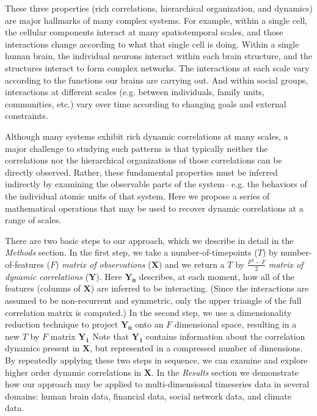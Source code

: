 \documentclass[english]{article}
\begin{document}
These three properties (rich correlations, hierarchical organization, and dynamics) are major hallmarks of many complex systems.  For example, within a single cell, the cellular components interact at many spatiotemporal scales, and those interactions change according to what that single cell is doing.  Within a single human brain, the individual neurons interact within each brain structure, and the structures interact to form complex networks.  The interactions at each scale vary according to the functions our brains are carrying out.  And within social groups, interactions at different scales (e.g. between individuals, family units, communities, etc.) vary over time according to changing goals and external constraints.

Although many systems exhibit rich dynamic correlations at many scales, a major challenge to studying such patterns is that typically neither the correlations nor the hierarchical organizations of those correlations can be directly observed.  Rather, these fundamental properties must be inferred indirectly by examining the observable parts of the system-- e.g. the behaviors of the individual atomic units of that system.  Here we propose a series of mathematical operations that may be used to recover dynamic correlations at a range of scales.

There are two basic steps to our approach, which we describe in detail in the \textit{Methods} section.  In the first step, we take a number-of-timepoints ($T$) by number-of-features ($F$) \textit{matrix of observations} ($\mathbf{X}$) and we return a $T$ by $\frac{F^2 - F}{2}$ \textit{matrix of dynamic correlations} ($\mathbf{Y}$).  Here $\mathbf{Y_0}$ describes, at each moment, how all of the features (columns of $\mathbf{X}$) are inferred to be interacting.  (Since the interactions are assumed to be non-recurrent and symmetric, only the upper triangle of the full correlation matrix is computed.)  In the second step, we use a dimensionality reduction technique to project $\mathbf{Y_0}$ onto an $F$ dimensional space, resulting in a new $T$ by $F$ matrix $\mathbf{Y_1}$  Note that $\mathbf{Y_1}$ contains information about the correlation dynamics present in $\mathbf{X}$, but represented in a compressed number of dimensions.  By repeatedly applying these two steps in sequence, we can examine and explore higher order dynamic correlations in $\mathbf{X}$.  In the \textit{Results} section we demonstrate how our approach may be applied to multi-dimensional timeseries data in several domains: human brain data, financial data, social network data, and climate data. 
\end{document}
